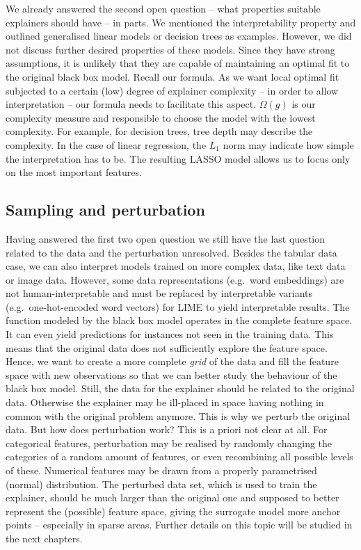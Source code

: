 \documentclass[]{krantz}
\begin{document}
We already answered the second open question -- what properties suitable
explainers should have -- in parts. We mentioned the interpretability
property and outlined generalised linear models or decision trees as
examples. However, we did not discuss further desired properties of
these models. Since they have strong assumptions, it is unlikely that
they are capable of maintaining an optimal fit to the original black box
model. Recall our formula. As we want local optimal fit subjected to a
certain (low) degree of explainer complexity -- in order to allow
interpretation -- our formula needs to facilitate this aspect.
\(\Omega\left(g\right)\) is our complexity measure and responsible to
choose the model with the lowest complexity. For example, for decision
trees, tree depth may describe the complexity. In the case of linear
regression, the \(L_1\) norm may indicate how simple the interpretation
has to be. The resulting LASSO model allows us to focus only on the most
important features.

\subsection{Sampling and perturbation}\label{sampling-and-perturbation}

Having answered the first two open question we still have the last
question related to the data and the perturbation unresolved. Besides
the tabular data case, we can also interpret models trained on more
complex data, like text data or image data. However, some data
representations (e.g.~word embeddings) are not human-interpretable and
must be replaced by interpretable variants (e.g.~one-hot-encoded word
vectors) for LIME to yield interpretable results. The function modeled
by the black box model operates in the complete feature space. It can
even yield predictions for instances not seen in the training data. This
means that the original data does not sufficiently explore the feature
space. Hence, we want to create a more complete \emph{grid} of the data
and fill the feature space with new observations so that we can better
study the behaviour of the black box model. Still, the data for the
explainer should be related to the original data. Otherwise the
explainer may be ill-placed in space having nothing in common with the
original problem anymore. This is why we perturb the original data. But
how does perturbation work? This is a priori not clear at all. For
categorical features, perturbation may be realised by randomly changing
the categories of a random amount of features, or even recombining all
possible levels of these. Numerical features may be drawn from a
properly parametrised (normal) distribution. The perturbed data set,
which is used to train the explainer, should be much larger than the
original one and supposed to better represent the (possible) feature
space, giving the surrogate model more anchor points -- especially in
sparse areas. Further details on this topic will be studied in the next
chapters.
\end{document}
